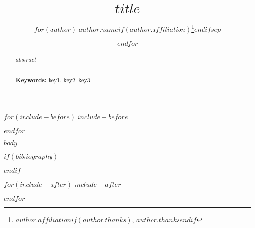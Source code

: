 \documentclass[12pt]{article}
\title{$title$}
\author{
$for(author)$
$author.name$$if(author.affiliation)$\thanks{$author.affiliation$$if(author.thanks)$, $author.thanks$$endif$}$endif$$sep$ \and 
$endfor$
}
\begin{document}
\maketitle

\begin{abstract}
$abstract$

\noindent
\vspace{0in}\\
\noindent\textbf{Keywords:} key1, key2, key3\\
\bigskip
\end{abstract}

\setcounter{page}{1}

$for(include-before)$
$include-before$

$endfor$

$body$

$if(bibliography)$
\newpage


$endif$

$for(include-after)$
$include-after$

$endfor$

\end{document}
